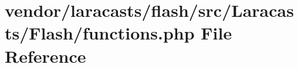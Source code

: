 \section{vendor/laracasts/flash/src/\+Laracasts/\+Flash/functions.php File Reference}
\label{laracasts_2flash_2src_2_laracasts_2_flash_2functions_8php}
